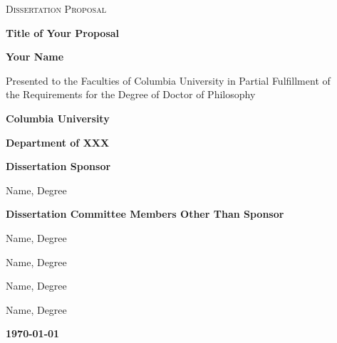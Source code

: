\begin{titlepage}
	\centering
	{\scshape\Large Dissertation Proposal\par}
	\vspace{2.5cm}
	{\LARGE\bfseries Title of Your Proposal \par}
	\vspace{2.5cm}
	{\Large\bfseries Your Name \par}
	\vspace{0.2cm}
	{\Large Presented to the Faculties of Columbia University in Partial Fulfillment of \\ the Requirements for the Degree of Doctor of Philosophy\par}
	\vspace{0.8cm}
	{\Large\bfseries Columbia University \par}
	\vspace{0.2cm}
	{\Large\bfseries Department of XXX \par}
	\vfill
	
	\begin{flushleft}
	{\Large\bfseries Dissertation Sponsor\par}
	\vspace{0.2cm}
	{\Large Name, Degree}
	\vspace{1.0cm}
	
	{\Large\bfseries Dissertation Committee Members Other Than Sponsor\par}
	\vspace{0.2cm}	
	{\Large Name, Degree \par}	
	{\Large Name, Degree \par}
	{\Large Name, Degree \par}
	{\Large Name, Degree \par}	 
	\end{flushleft}
	\vfill
	{\large\bfseries \today\par}
\end{titlepage}